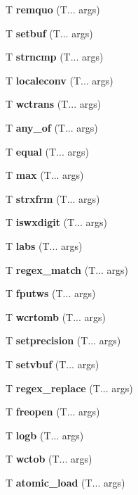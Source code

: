 \begin{DoxyCompactItemize}
T \textbf{ remquo} (T... args)
\item 
\mbox{\label{setbuf}} 
T \textbf{ setbuf} (T... args)
\item 
\mbox{\label{strncmp}} 
T \textbf{ strncmp} (T... args)
\item 
\mbox{\label{localeconv}} 
T \textbf{ localeconv} (T... args)
\item 
\mbox{\label{wctrans}} 
T \textbf{ wctrans} (T... args)
\item 
\mbox{\label{all_any_none_of}} 
T \textbf{ any\+\_\+of} (T... args)
\item 
\mbox{\label{equal}} 
T \textbf{ equal} (T... args)
\item 
\mbox{\label{max}} 
T \textbf{ max} (T... args)
\item 
\mbox{\label{strxfrm}} 
T \textbf{ strxfrm} (T... args)
\item 
\mbox{\label{iswxdigit}} 
T \textbf{ iswxdigit} (T... args)
\item 
\mbox{\label{abs}} 
T \textbf{ labs} (T... args)
\item 
\mbox{\label{regex_match}} 
T \textbf{ regex\+\_\+match} (T... args)
\item 
\mbox{\label{fputws}} 
T \textbf{ fputws} (T... args)
\item 
\mbox{\label{wcrtomb}} 
T \textbf{ wcrtomb} (T... args)
\item 
\mbox{\label{setprecision}} 
T \textbf{ setprecision} (T... args)
\item 
\mbox{\label{setvbuf}} 
T \textbf{ setvbuf} (T... args)
\item 
\mbox{\label{regex_replace}} 
T \textbf{ regex\+\_\+replace} (T... args)
\item 
\mbox{\label{freopen}} 
T \textbf{ freopen} (T... args)
\item 
\mbox{\label{logb}} 
T \textbf{ logb} (T... args)
\item 
\mbox{\label{wctob}} 
T \textbf{ wctob} (T... args)
\item 
\mbox{\label{atomic_load}} 
T \textbf{ atomic\+\_\+load} (T... args)
\item 

\end{DoxyCompactItemize}
